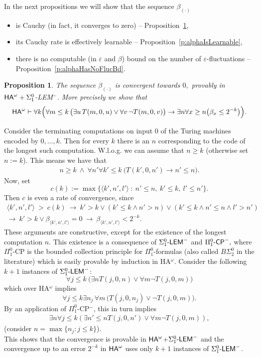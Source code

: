 \documentclass[1p]{elsarticle}
\newcommand{\usftext}[1]{\textsf{\upshape #1}}
\newcommand{\ba}{\begin{array}} \newcommand{\ea}{\end{array}}
\newcommand{\ha}{\ensuremath{{\usftext{HA}}^\omega}} %
\newcommand{\LEM}{\ensuremath{\Sigma^0_1\usftext{-LEM}}}
\newcommand{\CP}{\ensuremath{\usftext{CP}}}
\newcommand{\m}{\ensuremath{\usftext{-}}}
\theoremstyle{plain}
\newtheorem{prop}[thm]{Proposition}
\theoremstyle{definition}
\theoremstyle{remark}
\renewenvironment{proof}[1][]{\noindent{\bf Proof{#1}. }}{\nopagebreak[4]{\hspace*{\fill}
  $\Box$              %
 }{\vspace{2ex}}}
\renewcommand{\epsilon}{\varepsilon}
\theoremstyle{definition}
\begin{document}
{In the next propositions we will show that the sequence $\beta_{(\cdot)}$
\begin{itemize}
\item is Cauchy (in fact, it converges to zero) -- 
Proposition~\ref{p:alphaIsCauchy},
\item its Cauchy rate is effectively learnable -- Proposition~\ref{p:alphaIsLearnable},
\item there is no computable (in $\epsilon$ and $\beta$) bound on the number of $\epsilon$-fluctuations -- Proposition~\ref{p:alphaHasNoFlucBd}.
\end{itemize}

\begin{prop}\label{p:alphaIsCauchy}
The sequence $\beta_{(\cdot)}$ is convergent towards $0,$ provably in 
{\rm $\ha+\Sigma^0_1$-LEM$^-$}. More precisely we show that
\[ 
\ha
\vdash 
\forall k \Big( 
\forall m\leq k \,\big(\exists u\,T(m,0,u) \vee \forall v\,\neg T(m,0,v)\big)\rightarrow \exists n \forall x\geq n\big(\beta_x\leq2^{-k}\big)\Big).
 \]
\end{prop}
\begin{proof}
Consider the terminating computations on input $0$ of the Turing machines encoded by $0,\ldots,k$. Then for every $k$ there is an $n$ corresponding to the
code of the longest such computation. W.l.o.g. we can assume that $n\geq k$ (otherwise set $n:=k$). This means we have that
\begin{align}
n\geq k\ \wedge\ \forall n'\forall k'\leq k\ \big( T(k',0,n')\rightarrow n'\leq n\big).\label{e:ac-n}
\end{align}
Now, set \[ c(k):=\max\{ \langle k',n',l' \rangle\ :\ n'\leq n,\ k'\leq k,\ l'\leq n'\}.\]
Then $c$ is even a rate of convergence, since
\[\ba{l} 
\langle k',n',l'\rangle\ >\ c(k)\ \rightarrow\ k'>k \vee (k'\le k \wedge n'>n)
\vee (k'\le k\wedge n'\le n\wedge l'>n')\\  
\rightarrow\ k'>k \vee \beta_{\langle k',n',l'\rangle}=0 \ \rightarrow\ \beta_{\langle k',n',l'\rangle} < 2^{-k}. \ea 
\]
These arguments are constructive, except for the existence of the longest computation $n$.
This existence is a consequence of $\LEM^-$ and $\Pi^0_1\m\CP^-,$ where 
$\Pi^0_1$-CP is the bounded collection principle for $\Pi^0_1$-formulas 
(also called $B\Sigma^0_2$ in the literature) which is easily provable by 
induction in HA$^{\omega}$.
Consider the following $k+1$ instances of $\LEM^-$:
\[ \forall j\leq k\ \big( \exists n T(j,0,n) \vee \forall m \neg T(j,0,m)\big) \] which over HA$^{\omega}$ implies 
\[ \forall j\leq k \exists n_j \,\forall m\,\big( T(j,0,n_j) \vee \neg T(j,0,m)\big). \] 
By an application of $\Pi^0_1$-CP$^-$, this in turn
implies
\begin{align*}
\exists n\forall j\leq k ( \exists n'\leq n T(j,0,n') \vee \forall m \neg T(j,0,m) ),
\end{align*}
 (consider $n=\max \{n_j : j\leq k\}$).\\
This shows that the convergence is provable in $\ha$+$\LEM^-$ and the convergence up to an error $2^{-k}$ in $\ha$ uses
only $k+1$ instances of $\LEM^-$.
\end{proof}



}
\end{document}
